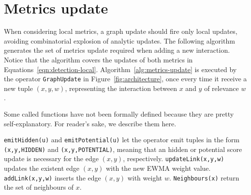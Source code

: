 \section{Metrics update}
\label{sec:metrics-update}

When considering local metrics, a graph update should fire only local updates, avoiding combinatorial explosion of analytic updates.
The following algorithm generates the set of metrics update required when adding a new interaction.
Notice that the algorithm covers the updates of both metrics in Equations~\ref{eqn:detection-local}. 
Algorithm~\ref{alg:metrics-update} is executed by the operator \texttt{GraphUpdate} in Figure~\ref{fig:architecture}, once every time it receive a new tuple $(x,y,w)$, representing the interaction between $x$ and $y$ of relevance $w$.

Some called functions have not been formally defined because they are pretty self-explanatory. For reader's sake, we describe them here. 

\texttt{emitHidden(u)} and \texttt{emitPotential(u)} let the operator emit tuples in the form \texttt{(x,y,HIDDEN)} and \texttt{(x,y,POTENTIAL)}, meaning that an hidden or potential score update is necessary for the edge $(x,y)$, respectively.
\texttt{updateLink(x,y,w)} updates the existent edge $(x,y)$ with the new EWMA weight value. 
\texttt{addLink(x,y,w)} inserts the edge $(x,y)$ with weight $w$. 
\texttt{Neighbours(x)} return the set of neighbours of $x$.

